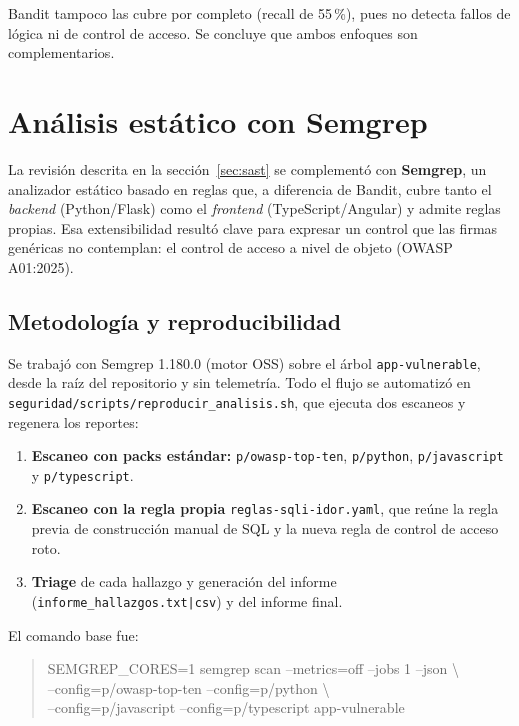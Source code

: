 \documentclass[11pt,letterpaper]{article}
\newcommand{\f}[1]{\texttt{#1}}
\begin{document}
Bandit tampoco las cubre por completo (recall de 55\,\%), pues no detecta fallos de lógica ni de control de acceso. Se concluye que ambos enfoques son complementarios.

\section{Análisis estático con Semgrep}\label{sec:semgrep}

La revisión descrita en la sección~\ref{sec:sast} se complementó con \textbf{Semgrep}, un analizador estático basado en reglas que, a diferencia de Bandit, cubre tanto el \textit{backend} (Python/Flask) como el \textit{frontend} (TypeScript/Angular) y admite reglas propias. Esa extensibilidad resultó clave para expresar un control que las firmas genéricas no contemplan: el control de acceso a nivel de objeto (OWASP A01:2025).

\subsection{Metodología y reproducibilidad}

Se trabajó con Semgrep 1.180.0 (motor OSS) sobre el árbol \f{app-vulnerable}, desde la raíz del repositorio y sin telemetría. Todo el flujo se automatizó en \f{seguridad/scripts/reproducir\_analisis.sh}, que ejecuta dos escaneos y regenera los reportes:

\begin{enumerate}
  \item \textbf{Escaneo con packs estándar:} \f{p/owasp-top-ten}, \f{p/python}, \f{p/javascript} y \f{p/typescript}.
  \item \textbf{Escaneo con la regla propia} \f{reglas-sqli-idor.yaml}, que reúne la regla previa de construcción manual de SQL y la nueva regla de control de acceso roto.
  \item \textbf{Triage} de cada hallazgo y generación del informe (\f{informe\_hallazgos.txt|csv}) y del informe final.
\end{enumerate}

El comando base fue:

\begin{quote}\small\ttfamily
SEMGREP\_CORES=1 semgrep scan --metrics=off --jobs 1 --json \textbackslash\\
\hspace*{1em}--config=p/owasp-top-ten --config=p/python \textbackslash\\
\hspace*{1em}--config=p/javascript --config=p/typescript app-vulnerable
\end{quote}
\end{document}
